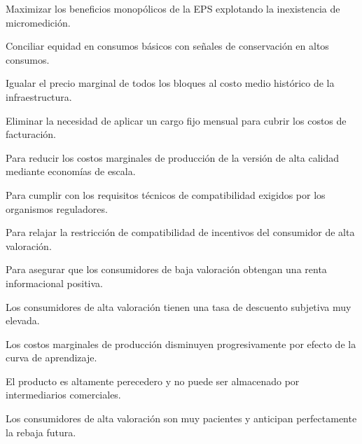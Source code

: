 \begin{opts}
    \item Maximizar los beneficios monopólicos de la EPS explotando la inexistencia de micromedición.
    \item Conciliar equidad en consumos básicos con señales de conservación en altos consumos.
    \item Igualar el precio marginal de todos los bloques al costo medio histórico de la infraestructura.
    \item Eliminar la necesidad de aplicar un cargo fijo mensual para cubrir los costos de facturación.
\end{opts}

\begin{opts}
    \item Para reducir los costos marginales de producción de la versión de alta calidad mediante economías de escala.
    \item Para cumplir con los requisitos técnicos de compatibilidad exigidos por los organismos reguladores.
    \item Para relajar la restricción de compatibilidad de incentivos del consumidor de alta valoración.
    \item Para asegurar que los consumidores de baja valoración obtengan una renta informacional positiva.
\end{opts}

\begin{opts}
    \item Los consumidores de alta valoración tienen una tasa de descuento subjetiva muy elevada.
    \item Los costos marginales de producción disminuyen progresivamente por efecto de la curva de aprendizaje.
    \item El producto es altamente perecedero y no puede ser almacenado por intermediarios comerciales.
    \item Los consumidores de alta valoración son muy pacientes y anticipan perfectamente la rebaja futura.
\end{opts}

